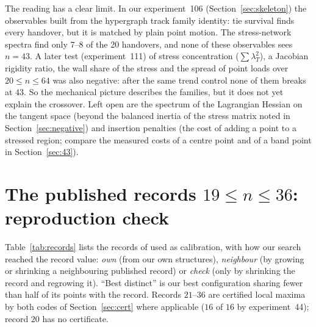 \documentclass[11pt]{amsart}
\theoremstyle{definition}
\begin{document}
The reading has a clear limit. In our experiment~106 (Section~\ref{sec:skeleton}) the observables built from the hypergraph track family identity: tie survival finds every handover, but it is matched by plain point motion. The stress-network spectra find only 7--8 of the 20 handovers, and none of these observables sees $n = 43$. A later test (experiment~111) of stress concentration ($\sum\lambda_T^2$), a Jacobian rigidity ratio, the wall share of the stress and the spread of point loads over $20 \le n \le 64$ was also negative: after the same trend control none of them breaks at $43$. So the mechanical picture describes the families, but it does not yet explain the crossover. Left open are the spectrum of the Lagrangian Hessian on the tangent space (beyond the balanced inertia of the stress matrix noted in Section~\ref{sec:negative}) and insertion penalties (the cost of adding a point to a stressed region; compare the measured costs of a centre point and of a band point in Section~\ref{sec:43}). %


\appendix
\section{The published records \texorpdfstring{$19 \le n \le 36$}{19 <= n <= 36}: reproduction check}\label{app:records}
Table~\ref{tab:records} lists the records of \cite{Stead} used as calibration, with how our search reached the record value: \emph{own} (from our own structures), \emph{neighbour} (by growing or shrinking a neighbouring published record) or \emph{check} (only by shrinking the record and regrowing it). ``Best distinct'' is our best configuration sharing fewer than half of its points with the record. Records $21$--$36$ are certified local maxima by both codes of Section~\ref{sec:cert} where applicable ($16$ of $16$ by experiment~44); record $20$ has no certificate. %
\end{document}
